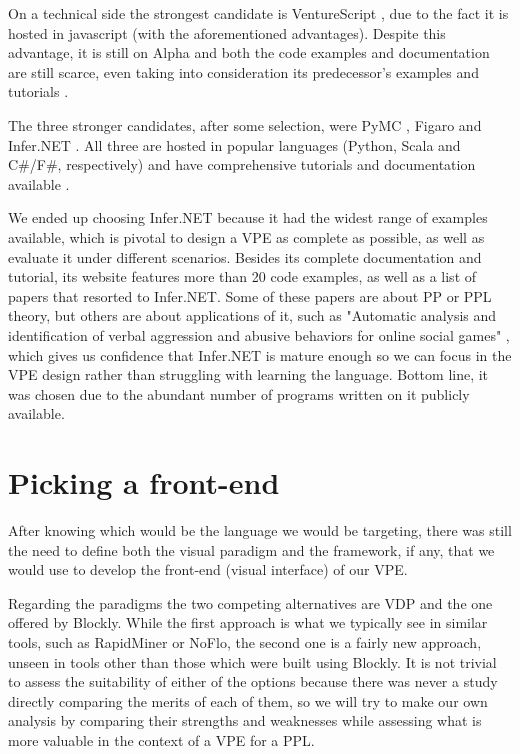 On a technical side the strongest candidate is VentureScript \cite{probcomp},
due to the fact it is hosted in javascript (with the aforementioned advantages).
Despite this advantage, it is still on Alpha and both the code examples and
documentation are still scarce, even taking into consideration its predecessor's
examples \cite{forestdb} and tutorials \cite{church}.

The three stronger candidates, after some selection, were PyMC \cite{pymc},
Figaro \cite{figaro} and Infer.NET \cite{InferNET14}. All three are hosted in popular languages
(Python, Scala and C#/F#, respectively) and have comprehensive tutorials and
documentation available \cite{pymct}\cite{figarot}\cite{InferNET14t}.

We ended up choosing Infer.NET because it had the widest range of examples
available, which is pivotal to design a VPE as complete as possible, as well
as evaluate it under different scenarios. Besides its complete documentation
and tutorial, its website features more than 20 code examples, as well as a list
of papers that resorted to Infer.NET. Some of these papers are about PP or PPL theory,
but others are about applications of it, such as "Automatic analysis and
identification of verbal aggression and abusive behaviors for online social
games" \cite{balci2015automatic}, which gives us confidence that Infer.NET is
mature enough so we can focus in the VPE design rather than struggling with
learning the language. Bottom line, it was chosen due to the abundant number of
programs written on it publicly available.

\section{Picking a front-end}

After knowing which would be the language we would be targeting, there was still
the need to define both the visual paradigm and the framework, if any, that we
would use to develop the front-end (visual interface) of our VPE.

Regarding the paradigms the two competing alternatives are VDP and the one offered
by Blockly. While the first approach is what we typically see in similar tools,
such as RapidMiner or NoFlo, the second one is a fairly new approach, unseen
in tools other than those which were built using Blockly. It is not trivial to
assess the suitability of either of the options because there was never a study
directly comparing the merits of each of them, so we will try to make our own
analysis by comparing their strengths and weaknesses while assessing what is
more valuable in the context of a VPE for a PPL.

